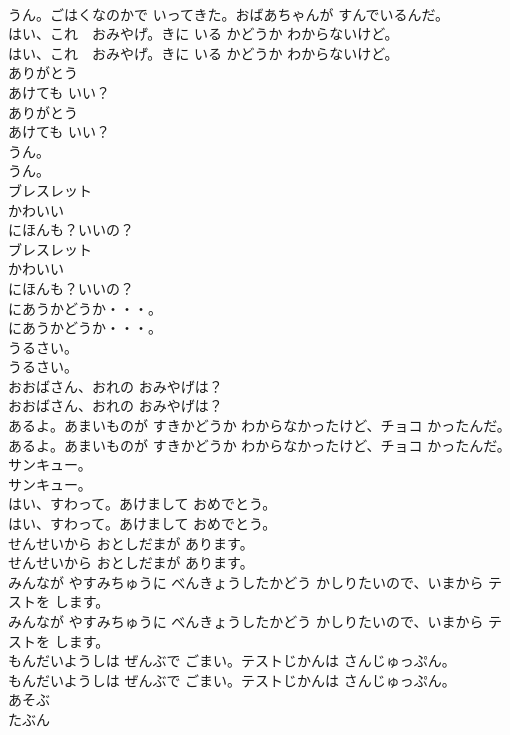 \documentclass[8pt]{extreport}
\begin{document}
\begin{CJK}{UTF8}{min}
\\	うん。ごはくなのかで いってきた。おばあちゃんが すんでいるんだ。
\\	はい、これ　おみやげ。きに いる かどうか わからないけど。
\\	はい、これ　おみやげ。きに いる かどうか わからないけど。
\\	ありがとう
\\	あけても いい？
\\	ありがとう
\\	あけても いい？
\\	うん。
\\	うん。
\\	ブレスレット
\\	かわいい
\\	にほんも？いいの？
\\	ブレスレット
\\	かわいい
\\	にほんも？いいの？
\\	にあうかどうか・・・。
\\	にあうかどうか・・・。
\\	うるさい。
\\	うるさい。
\\	おおばさん、おれの おみやげは？
\\	おおばさん、おれの おみやげは？
\\	あるよ。あまいものが すきかどうか わからなかったけど、チョコ かったんだ。
\\	あるよ。あまいものが すきかどうか わからなかったけど、チョコ かったんだ。
\\	サンキュー。
\\	サンキュー。
\\	はい、すわって。あけまして おめでとう。
\\	はい、すわって。あけまして おめでとう。
\\	せんせいから おとしだまが あります。
\\	せんせいから おとしだまが あります。
\\	みんなが やすみちゅうに べんきょうしたかどう かしりたいので、いまから テストを します。
\\	みんなが やすみちゅうに べんきょうしたかどう かしりたいので、いまから テストを します。
\\	もんだいようしは ぜんぶで ごまい。テストじかんは さんじゅっぷん。
\\	もんだいようしは ぜんぶで ごまい。テストじかんは さんじゅっぷん。
\\	あそぶ
\\	たぶん

\end{CJK}
\end{document}
